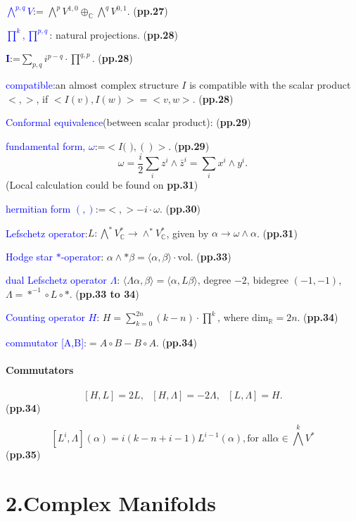 \documentclass{book}
\numberwithin{equation}{subsection} %
\theoremstyle{definition}
\begin{document}
    \textcolor{blue}{$\bigwedge^{p,q} V$}:=
    $\bigwedge^p V^{1,0}\oplus_{\mathbb{C}}\bigwedge^q V^{0,1}$.
    (\textbf{pp.27})

    \textcolor{blue}{$\prod^k,\prod^{p,q}$}: natural projections.
    (\textbf{pp.28})
    
    \textcolor{blue}{$\mathbf{I}$}:=$\sum_{p,q}i^{p-q}\cdot\prod^{q,p}$.
    (\textbf{pp.28})

    \textcolor{blue}{compatible}:an almost complex structure $I$ is
    compatible with the scalar product $<,>$, if $<I(v),I(w)>=<v,w>$.
    (\textbf{pp.28})

    \textcolor{blue}{Conformal equivalence}(between scalar product):
    (\textbf{pp.29})

    \textcolor{blue}{fundamental form, $\omega$}:=$<I\text{( )},()>.$
    (\textbf{pp.29})
    $$\omega=\frac{i}{2}\sum_i z^i\wedge\bar{z}^i=\sum_i x^i\wedge y^i.$$
    \quad(Local calculation could be found on \textbf{pp.31})

    \textcolor{blue}{hermitian form $(,)$}:=$<,>-i\cdot\omega$.
    (\textbf{pp.30})

    \textcolor{blue}{Lefschetz operator}:$L:\bigwedge^* V^*_{\mathbb{C}}\to
    \wedge^* V_{\mathbb{C}}^*$, given by $\alpha\to\omega\wedge\alpha$.
    (\textbf{pp.31})

    \textcolor{blue}{Hodge star $*$-operator}: $\alpha\wedge *\beta=
        \langle\alpha,\beta\rangle \cdot \text{vol}$.
    (\textbf{pp.33})

    \textcolor{blue}{dual Lefschetz operator $\Lambda$}:
        $\langle\Lambda\alpha,\beta\rangle =\langle\alpha,L\beta\rangle$,
        degree $-2$, bidegree $(-1,-1)$, $\Lambda=*^{-1}\circ L\circ *$.
    (\textbf{pp.33 to 34})

    \textcolor{blue}{Counting operator $H$}:
        $H=\sum_{k=0}^{2n}(k-n)\cdot\prod^k$, 
        where $\text{dim}_{\mathbb{R}}=2n$.
    (\textbf{pp.34})

    \textcolor{blue}{commutator [A,B]}:$=A\circ B-B\circ A$.
    (\textbf{pp.34})


\paragraph{Commutators}
$$[H,L]=2L,\text{ } [H,\Lambda]=-2\Lambda,\text{ } [L,\Lambda]=H.$$
(\textbf{pp.34})

$$[L^i,\Lambda](\alpha)= i(k-n+i-1)L^{i-1}(\alpha),\text{for all}
    \alpha\in\bigwedge^k V^*$$
(\textbf{pp.35})
\section{2.Complex Manifolds}
\end{document}

